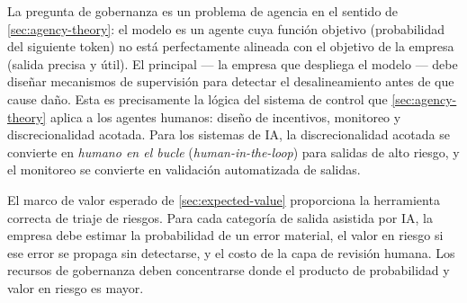 La pregunta de gobernanza es un problema de agencia en el sentido de \cref{sec:agency-theory}: el
modelo es un agente cuya función objetivo (probabilidad del siguiente token) no está perfectamente
alineada con el objetivo de la empresa (salida precisa y útil). El principal — la empresa que
despliega el modelo — debe diseñar mecanismos de supervisión para detectar el desalineamiento antes
de que cause daño. Esta es precisamente la lógica del sistema de control que \cref{sec:agency-theory}
aplica a los agentes humanos: diseño de incentivos, monitoreo y discrecionalidad acotada. Para los
sistemas de IA, la discrecionalidad acotada se convierte en \emph{humano en el bucle}
(\emph{human-in-the-loop}) para salidas de alto riesgo, y el monitoreo se convierte en validación
automatizada de salidas.

El marco de valor esperado de \cref{sec:expected-value} proporciona la herramienta correcta de
triaje de riesgos. Para cada categoría de salida asistida por IA, la empresa debe estimar la
probabilidad de un error material, el valor en riesgo si ese error se propaga sin detectarse, y el
costo de la capa de revisión humana. Los recursos de gobernanza deben concentrarse donde el
producto de probabilidad y valor en riesgo es mayor.

